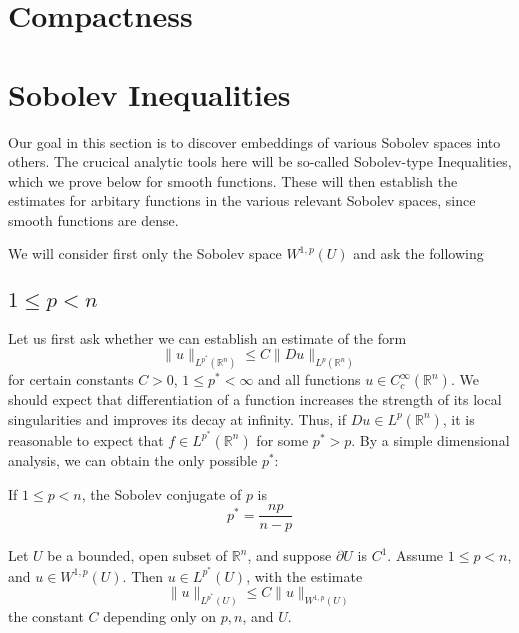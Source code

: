 \section{Compactness}




\section{Sobolev Inequalities}
Our goal in this section is to discover embeddings of various Sobolev spaces into others. 
The crucical analytic tools here will be so-called Sobolev-type Inequalities, which we prove below for smooth functions.
These will then establish the estimates for arbitary functions in the various relevant Sobolev spaces, since smooth functions are dense.

We will consider first only the Sobolev space $W^{1,p}(U)$ and ask the following 
\subsection{\texorpdfstring{$1\le p<n$}{1<=p<n}}

Let us first ask whether we can establish an estimate of the form 
\[ \|u\|_{L^{p^*}(\mathbb{R}^n)}\le C\|Du\|_{L^p(\mathbb{R}^n)}\] 
for certain constants $C>0$, $1\le p^*<\infty$ and all functions $u\in C^\infty_c(\mathbb{R}^n)$.
We should expect that differentiation of a function increases the strength of its local singularities and improves its decay at infinity.
Thus, if $Du\in L^p(\mathbb{R}^n)$, it is reasonable to expect that $f\in L^{p^*}(\mathbb{R}^n)$ for some $p^*>p$.
By a simple dimensional analysis, we can obtain the only possible $p^*$:
\begin{definition}
    If $1\le p<n$, the Sobolev conjugate of $p$ is 
    \[p^*=\frac{np}{n-p}\] 
\end{definition}


\begin{theorem}
    
\end{theorem}

\begin{theorem}
    Let $U$ be a bounded, open subset of $\mathbb{R}^n$, and suppose $\partial U$ is $C^1$. Assume $1\le p<n$, and $u\in W^{1,p}(U)$.
    Then $u\in L^{p^*}(U)$, with the estimate 
    \[ \|u\|_{L^{p^*}(U)}\le C\|u\|_{W^{1,p}(U)}\] 
    the constant $C$ depending only on $p,n$, and $U$.
\end{theorem}


